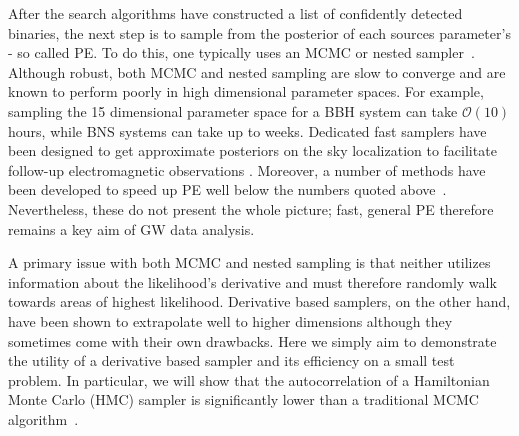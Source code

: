 \documentclass[twocolumn]{aastex631}
\newcommand{\AZ}[1]{{\color{Burnt}[AZ: #1]}}
\newcommand{\amc}[1]{{\color{red}[AC: #1]}}
\begin{document}
After the search algorithms have constructed a list of confidently detected binaries, the next step is to sample from the posterior of each sources parameter's - so called PE.
To do this, one typically uses an MCMC or nested sampler~\citep{Skilling2004, multinest, dynesty}.
Although robust, both MCMC and nested sampling are slow to converge and are known to perform poorly in high dimensional parameter spaces.
For example, sampling the 15 dimensional parameter space for a BBH system can take $\mathcal{O}(10)$ hours, while BNS systems can take up to weeks.
Dedicated fast samplers have been designed to get approximate posteriors on the sky localization to facilitate follow-up electromagnetic observations \citep[e.g.~\texttt{BAYESTAR}][]{Singer:2015ema}. 
Moreover, a number of methods have been developed to speed up PE well below the numbers quoted above~\citep{Dax:2021tsq, Islam:2022afg,Roulet:2022kot, Zackay:2018qdy, Cornish:2021lje, Canizares:2013ywa, Leslie:2021ssu}.
Nevertheless, these do not present the whole picture; fast, general PE therefore remains a key aim of GW data analysis.

A primary issue with both MCMC and nested sampling is that neither utilizes information about the likelihood's derivative and must therefore randomly walk towards areas of highest likelihood.
Derivative based samplers, on the other hand, have been shown to extrapolate well to higher dimensions although they sometimes come with their own drawbacks.
Here we simply aim to demonstrate the utility of a derivative based sampler and its efficiency on a small test problem.
In particular, we will show that the autocorrelation of a Hamiltonian Monte Carlo (HMC) sampler is significantly lower than a traditional MCMC algorithm~\citep{Bouffanais:2018hoz, 2014CQGra..31n5004P}.
\end{document}
